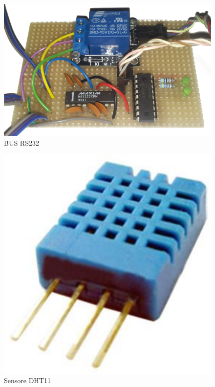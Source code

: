 \documentclass[a4paper,titlepage]{book}
\begin{document}
\begin{figure}[!h]
\centering
\includegraphics[scale=0.12]{bus_foto.png}
\caption{BUS RS232}
\end{figure}

\begin{figure}[!h]
\centering
\includegraphics[scale=0.5]{DHT11.png}
\caption{Sensore DHT11}
\end{figure}
\end{document}
